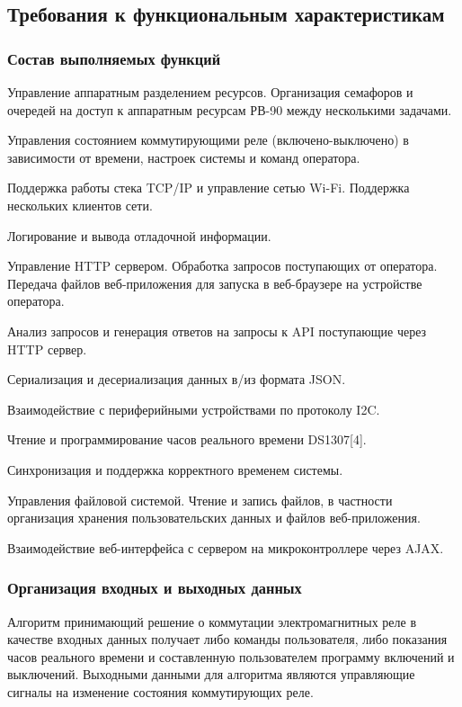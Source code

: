 

\subsection{Требования к функциональным характеристикам}
\subsubsection{Состав выполняемых функций}

\begin{my_enumerate}
\item Управление аппаратным разделением ресурсов. Организация семафоров и очередей на доступ к аппаратным ресурсам РВ-90 между несколькими задачами.
\item Управления состоянием коммутирующими реле (включено-выключено) в зависимости от времени, настроек системы и команд оператора.
\item Поддержка работы стека TCP/IP и управление сетью Wi-Fi. Поддержка нескольких клиентов сети.
\item Логирование и вывода отладочной информации.
\item Управление HTTP сервером. Обработка запросов поступающих от оператора. Передача файлов веб-приложения для запуска в веб-браузере на устройстве оператора. 
\item Анализ запросов и генерация ответов на запросы к API поступающие через HTTP сервер.
\item Сериализация и десериализация данных в/из формата JSON.
\item Взаимодействие с периферийными устройствами по протоколу I2C.
\item Чтение и программирование часов реального времени DS1307[4].
\item Синхронизация и поддержка корректного временем системы.
\item Управления файловой системой. Чтение и запись файлов, в частности организация хранения пользовательских данных и файлов веб-приложения.
\item Взаимодействие веб-интерфейса с сервером на микроконтроллере через AJAX.
\end{my_enumerate}

\subsubsection{Организация входных и выходных данных}
Алгоритм принимающий решение о коммутации электромагнитных реле в качестве входных данных получает либо команды пользователя, либо показания часов реального времени и составленную пользователем программу включений и выключений. Выходными данными для алгоритма являются управляющие сигналы на изменение состояния коммутирующих реле. 


